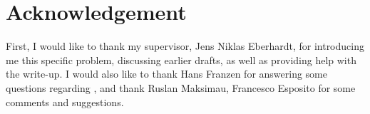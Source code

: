 %
%



\section*{Acknowledgement}
First, I would like to thank my supervisor, Jens Niklas Eberhardt, for introducing me this specific problem, discussing earlier drafts, as well as providing help with the write-up. I would also like to thank Hans Franzen for answering some questions regarding \cite{irelli2019cell}, and thank Ruslan Maksimau, Francesco Esposito for some comments and suggestions. 
